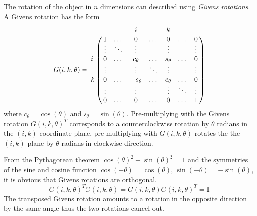 \documentclass[11pt,a4paper]{report}
\begin{document}
The rotation of the object in $n$ dimensions can described using
\textit{Givens rotations}. A Givens rotation has the form
\begin{equation}\label{eq:givens}
\mathit{G}(i,k,\theta) = 
\bordermatrix{
&&&i&&k& \cr
&1&\dotso&0&\dotso&0&\dotso&0 \cr
&\vdots&\ddots&\vdots&&\vdots&&\vdots \cr
i&0&\dotso&c_\theta&\dotso&s_\theta&\dotso&0 \cr
&\vdots&&\vdots&\ddots&\vdots&&\vdots \cr
k&0&\dotso&-s_\theta&\dotso&c_\theta&\dotso&0 \cr
&\vdots&&\vdots&&\vdots&\ddots&\vdots \cr
&0&\dotso&0&\dotso&0&\dotso&1 \cr
}
\end{equation}
where $c_\theta = \cos(\theta)$ and $s_\theta = \sin(\theta)$. Pre-multiplying with the Givens
rotation $\mathit{G}(i,k,\theta)^T$ corresponds to a counterclockwise rotation
by $\theta$ radians in the $(i,k)$ coordinate plane, pre-multiplying with
$\mathit{G}(i,k,\theta)$ rotates the the $(i,k)$ plane by $\theta$ radians in
clockwise direction.

From the Pythagorean theorem $\cos(\theta)^2 + \sin(\theta)^2 = 1$ and the symmetries of the sine and cosine function $\cos(-\theta) =
\cos(\theta)$, $\sin(-\theta) = -\sin(\theta)$, it is obvious that Givens rotations are
orthogonal.
\begin{equation}
\mathit{G}(i,k,\theta)^T\mathit{G}(i,k,\theta) =
\mathit{G}(i,k,\theta)\mathit{G}(i,k,\theta)^T = \mathbf{I}
\end{equation}
The transposed Givens rotation amounts to a rotation in the opposite direction by
the same angle thus the two rotations cancel out.
\end{document}
